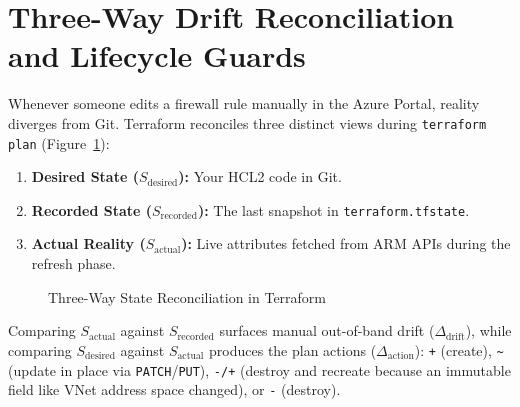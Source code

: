 \section{Three-Way Drift Reconciliation and Lifecycle Guards}

Whenever someone edits a firewall rule manually in the Azure Portal, reality diverges from Git. Terraform reconciles three distinct views during \texttt{terraform plan} (Figure~\ref{fig:v3-ch04-three-way}):
\begin{enumerate}[leftmargin=15pt]
  \item \textbf{Desired State ($S_{\text{desired}}$):} Your HCL2 code in Git.
  \item \textbf{Recorded State ($S_{\text{recorded}}$):} The last snapshot in \texttt{terraform.tfstate}.
  \item \textbf{Actual Reality ($S_{\text{actual}}$):} Live attributes fetched from ARM APIs during the refresh phase.
\end{enumerate}

\begin{figure}[htbp]
\centering
{}
\caption{Three-Way State Reconciliation in Terraform}
\label{fig:v3-ch04-three-way}
\end{figure}

Comparing $S_{\text{actual}}$ against $S_{\text{recorded}}$ surfaces manual out-of-band drift ($\Delta_{\text{drift}}$), while comparing $S_{\text{desired}}$ against $S_{\text{actual}}$ produces the plan actions ($\Delta_{\text{action}}$): \texttt{+} (create), \texttt{\textasciitilde{}} (update in place via \texttt{PATCH}/\texttt{PUT}), \texttt{-/+} (destroy and recreate because an immutable field like VNet address space changed), or \texttt{-} (destroy).

